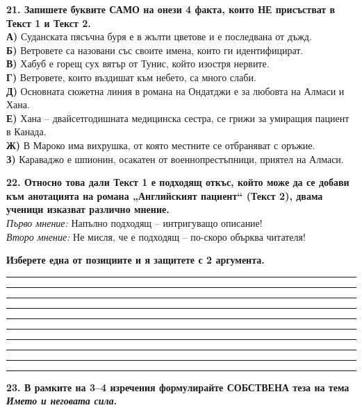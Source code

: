 \documentclass[12pt,a4paper]{article}
\begin{document}
\vspace{0.6cm}

\noindent
\textbf{21. Запишете буквите САМО на онези 4 факта, които НЕ присъстват в Текст 1 и Текст 2.} \\
\textbf{А)} Суданската пясъчна буря е в жълти цветове и е последвана от дъжд. \\
\textbf{Б)} Ветровете са назовани със своите имена, които ги идентифицират. \\
\textbf{В)} Хабуб е горещ сух вятър от Тунис, който изостря нервите. \\
\textbf{Г)} Ветровете, които въздишат към небето, са много слаби. \\
\textbf{Д)} Основната сюжетна линия в романа на Ондатджи е за любовта на Алмаси и Хана. \\
\textbf{Е)} Хана – двайсетгодишната медицинска сестра, се грижи за умиращия пациент в Канада. \\
\textbf{Ж)} В Мароко има вихрушка, от която местните се отбраняват с оръжие. \\
\textbf{З)} Караваджо е шпионин, осакатен от военнопрестъпници, приятел на Алмаси.

\vspace{0.6cm}

\noindent
\textbf{22. Относно това дали Текст 1 е подходящ откъс, който може да се добави към анотацията на романа „Английският пациент“ (Текст 2), двама ученици изказват различно мнение.} \\
\textit{Първо мнение:} Напълно подходящ – интригуващо описание! \\
\textit{Второ мнение:} Не мисля, че е подходящ – по-скоро обърква читателя!

\vspace{0.2cm}
\noindent
\textbf{Изберете една от позициите и я защитете с 2 аргумента.}

\vspace{0.3cm}
\noindent\rule{\linewidth}{0.4pt}
\noindent\rule{\linewidth}{0.4pt}
\noindent\rule{\linewidth}{0.4pt}
\noindent\rule{\linewidth}{0.4pt}
\noindent\rule{\linewidth}{0.4pt}
\noindent\rule{\linewidth}{0.4pt}
\noindent\rule{\linewidth}{0.4pt}
\noindent\rule{\linewidth}{0.4pt}
\noindent\rule{\linewidth}{0.4pt}
\noindent\rule{\linewidth}{0.4pt}

\vspace{0.6cm}

\noindent
\textbf{23. В рамките на 3–4 изречения формулирайте СОБСТВЕНА теза на тема \textit{Името и неговата сила}.}
\end{document}
